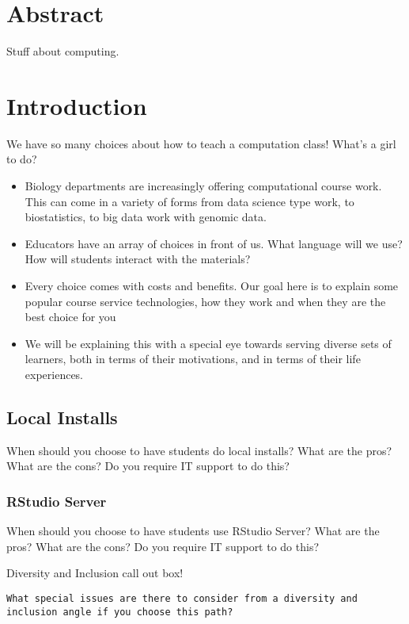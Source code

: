 
\section{Abstract}\label{sect:Abstract}

Stuff about computing.

\bigskip


\bigskip
\section{Introduction}\label{sect:Introduction}

We have so many choices about how to teach a computation class! 
What's a girl to do?

\begin{itemize}
\item Biology departments are increasingly offering computational course work. This can come in a variety of forms from data science type work, to biostatistics, to big data work with genomic data.  
\item Educators have an array of choices in front of us. What language will we use? How will students interact with the materials? 
\item Every choice comes with costs and benefits. Our goal here is to explain some popular course service technologies, how they work and when they are the best choice for you
\item We will be explaining this with a special eye towards serving diverse sets of learners, both in terms of their motivations, and in terms of their life experiences.
\end{itemize}

\subsection{Local Installs}\label{subsect:Local Installs}

When should you choose to have students do local installs?
What are the pros?
What are the cons?
Do you require IT support to do this?

\subsubsection{RStudio Server}\label{subsub:RStudio}

When should you choose to have students use RStudio Server?
What are the pros?
What are the cons?
Do you require IT support to do this?
{\begin{framed}
Diversity and Inclusion call out box! 
\begin{snugshade*}
\begin{lstlisting}
What special issues are there to consider from a diversity and inclusion angle if you choose this path?
\end{lstlisting}
\end{snugshade*}
\end{framed}}

